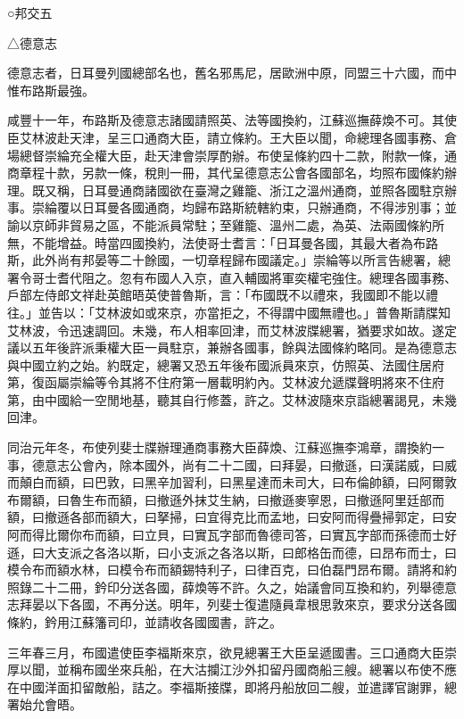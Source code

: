 
\begin{pinyinscope}
○邦交五

△德意志

德意志者，日耳曼列國總部名也，舊名邪馬尼，居歐洲中原，同盟三十六國，而中惟布路斯最強。

咸豐十一年，布路斯及德意志諸國請照英、法等國換約，江蘇巡撫薛煥不可。其使臣艾林波赴天津，呈三口通商大臣，請立條約。王大臣以聞，命總理各國事務、倉場總督崇綸充全權大臣，赴天津會崇厚酌辦。布使呈條約四十二款，附款一條，通商章程十款，另款一條，稅則一冊，其代呈德意志公會各國部名，均照布國條約辦理。既又稱，日耳曼通商諸國欲在臺灣之雞籠、浙江之溫州通商，並照各國駐京辦事。崇綸覆以日耳曼各國通商，均歸布路斯統轄約束，只辦通商，不得涉別事；並諭以京師非貿易之區，不能派員常駐；至雞籠、溫州二處，為英、法兩國條約所無，不能增益。時當四國換約，法使哥士耆言：「日耳曼各國，其最大者為布路斯，此外尚有邦晏等二十餘國，一切章程歸布國議定。」崇綸等以所言告總署，總署令哥士耆代阻之。忽有布國人入京，直入輔國將軍奕權宅強住。總理各國事務、戶部左侍郎文祥赴英館晤英使普魯斯，言：「布國既不以禮來，我國即不能以禮往。」並告以：「艾林波如或來京，亦當拒之，不得謂中國無禮也。」普魯斯請牒知艾林波，令迅速調回。未幾，布人相率回津，而艾林波牒總署，猶要求如故。遂定議以五年後許派秉權大臣一員駐京，兼辦各國事，餘與法國條約略同。是為德意志與中國立約之始。約既定，總署又恐五年後布國派員來京，仿照英、法國住居府第，復函屬崇綸等令其將不住府第一層載明約內。艾林波允遞牒聲明將來不住府第，由中國給一空閒地基，聽其自行修蓋，許之。艾林波隨來京詣總署謁見，未幾回津。

同治元年冬，布使列斐士牒辦理通商事務大臣薛煥、江蘇巡撫李鴻章，謂換約一事，德意志公會內，除本國外，尚有二十二國，曰拜晏，曰撤遜，曰漢諾威，曰威而顛白而額，曰巴敦，曰黑辛加習利，曰黑星達而未司大，曰布倫帥額，曰阿爾敦布爾額，曰魯生布而額，曰撤遜外抹艾生納，曰撤遜麥寧恩，曰撤遜阿里廷部而額，曰撤遜各部而額大，曰拏掃，曰宜得克比而孟地，曰安阿而得疊掃郭定，曰安阿而得比爾你布而額，曰立貝，曰實瓦字部而魯德司答，曰實瓦字部而孫德而士好遜，曰大支派之各洛以斯，曰小支派之各洛以斯，曰郎格缶而德，曰昂布而士，曰模令布而額水林，曰模令布而額錫特利子，曰律百克，曰伯磊門昂布爾。請將和約照錄二十二冊，鈐印分送各國，薛煥等不許。久之，始議會同互換和約，列舉德意志拜晏以下各國，不再分送。明年，列斐士復遣隨員韋根思敦來京，要求分送各國條約，鈐用江蘇籓司印，並請收各國國書，許之。

三年春三月，布國遣使臣李福斯來京，欲見總署王大臣呈遞國書。三口通商大臣崇厚以聞，並稱布國坐來兵船，在大沽攔江沙外扣留丹國商船三艘。總署以布使不應在中國洋面扣留敵船，詰之。李福斯接牒，即將丹船放回二艘，並遣譯官謝罪，總署始允會晤。


\end{pinyinscope}
